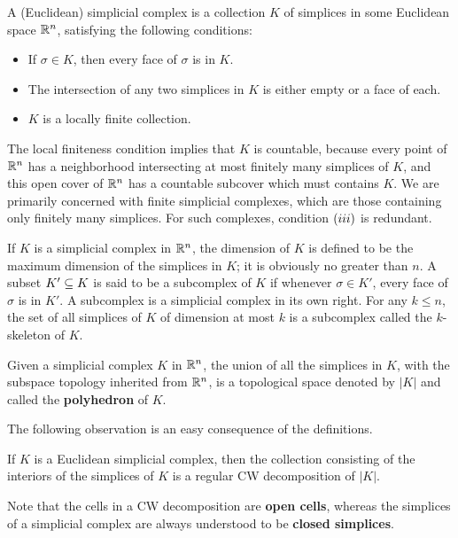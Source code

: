 A (Euclidean) simplicial complex is a collection $K$ of simplices in some Euclidean
space $\mathbb{R}^n$, satisfying the following conditions:
\begin{itemize}
\item If $\sigma\in K$, then every face of $\sigma$ is in $K$.
\item The intersection of any two simplices in $K$ is either empty or a face of each.
\item $K$ is a locally finite collection.
\end{itemize}
The local finiteness condition implies that $K$ is countable, because every point of $\mathbb{R}^n$ has a neighborhood intersecting at most finitely many simplices of $K$, and this open cover of $\mathbb{R}^n$ has a countable subcover which must contains $K$. We are primarily concerned with finite simplicial complexes, which are those containing only finitely many simplices. For such complexes, condition $(\rmnum{3})$ is redundant.\par
If $K$ is a simplicial complex in $\mathbb{R}^n$, the dimension of $K$ is defined to be the
maximum dimension of the simplices in $K$; it is obviously no greater than $n$. A subset $K'\subseteq K$ is said to be a subcomplex of $K$ if whenever $\sigma\in K'$, every face of $\sigma$ is in $K'$. A subcomplex is a simplicial complex in its own right. For any $k\leq n$, the set of all simplices of $K$ of dimension at most $k$ is a subcomplex called the $k$-skeleton of $K$.\par
Given a simplicial complex $K$ in $\mathbb{R}^n$, the union of all the simplices in $K$, with the subspace topology inherited from $\mathbb{R}^n$, is a topological space denoted by $|K|$ and called the \textbf{polyhedron} of $K$.\par
The following observation is an easy consequence of the definitions.
\begin{proposition}
If $K$ is a Euclidean simplicial complex, then the collection consisting of the interiors of the simplices of $K$ is a regular CW decomposition of $|K|$.
\end{proposition}
\begin{remark}
Note that the cells in a CW decomposition are \textbf{open cells}, whereas the simplices of a simplicial complex are always understood to be \textbf{closed simplices}.
\end{remark}
